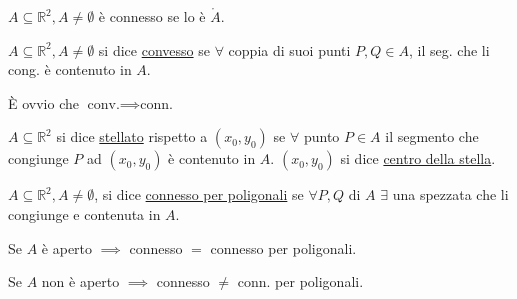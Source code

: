 \begin{center}
\end{center}

\begin{oss}
$A \subseteq \mathbb{R}^2, A \neq \emptyset$ è connesso se lo è $\mathring{A}$.
\end{oss}

\begin{definition}
$A \subseteq \mathbb{R}^2, A \neq \emptyset$ si dice \underline{convesso} se $\forall$ coppia di suoi punti $P, Q \in A$, il seg. che li cong. è contenuto in $A$.

È ovvio che $\text{conv.} \implies \text{conn.}$
\end{definition}

\begin{definition}
$A \subseteq \mathbb{R}^2$ si dice \underline{stellato} rispetto a $(x_0, y_0)$ se $\forall$ punto $P \in A$ il segmento che congiunge $P$ ad $(x_0, y_0)$ è contenuto in $A$. $(x_0, y_0)$ si dice \underline{centro della stella}.
\end{definition}

\begin{center}
\end{center}

\begin{definition}
$A \subseteq \mathbb{R}^2, A \neq \emptyset$, si dice \underline{connesso per poligonali} se $\forall P, Q$ di $A$ $\exists$ una spezzata che li congiunge e contenuta in $A$.
\end{definition}

\begin{oss}
Se $A$ è aperto $\implies$ connesso $=$ connesso per poligonali.

Se $A$ non è aperto $\implies$ connesso $\neq$ conn. per poligonali.
\end{oss}
